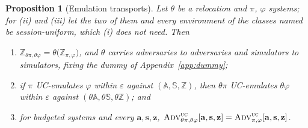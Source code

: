 \documentclass[11pt,a4paper]{article}
\newcommand{\bd}[1]{\mathbf{#1}}
\newcommand{\advtg}{\op{Adv}}
\newcommand{\Aset}{\mathbb{A}}
\newcommand{\SimSet}{\mathbb{S}}
\newcommand{\ZenvSet}{\mathbb{Z}}
\newcommand{\op}[1]{\textsc{#1}}
\theoremstyle{accentdef}
\theoremstyle{accentplain}
\newtheorem{proposition}[definition]{Proposition}
\begin{document}
\begin{proposition}[Emulation transports]\label{prop:relocemul}
Let $\theta$ be a relocation and $\pi$, $\varphi$ systems; for (ii) and (iii) let the two of them and
every environment of the classes named be session-uniform, which (i) does not need. Then
\begin{enumerate}[label=(\roman*),leftmargin=2.2em]
  \item $\ZenvSet_{\theta\pi,\theta\varphi} = \theta\bigl(\ZenvSet_{\pi,\varphi}\bigr)$, and
        $\theta$ carries adversaries to adversaries and simulators to simulators, fixing the dummy
        of Appendix~\ref{app:dummy};
  \item if $\pi$ UC-emulates $\varphi$ within $\varepsilon$ against
        $(\Aset,\SimSet,\ZenvSet)$, then $\theta\pi$ UC-emulates $\theta\varphi$ within
        $\varepsilon$ against $(\theta\Aset,\theta\SimSet,\theta\ZenvSet)$; and
  \item for budgeted systems and every $\bd{a},\bd{s},\bd{z}$,
        $\advtg^{\op{uc}}_{\theta\pi,\theta\varphi}[\bd{a},\bd{s},\bd{z}]
         = \advtg^{\op{uc}}_{\pi,\varphi}[\bd{a},\bd{s},\bd{z}]$.
\end{enumerate}
\end{proposition}
\end{document}

